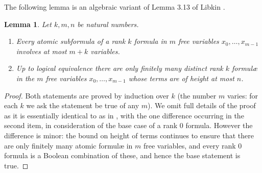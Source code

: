 \documentclass[10pt,a4paper]{amsart}
\theoremstyle{plain}
\newtheorem{lem}[thm]{Lemma}
\theoremstyle{definition}
\begin{document}
The following lemma is an algebraic variant of Lemma 3.13 of Libkin \cite{lib}.
\begin{lem}\label{lem:tpfinite}
Let $k,m,n$ be natural numbers.
\begin{enumerate}
\item Every atomic subformula of a rank $k$ formula in $m$ free variables $x_0,\dots,x_{m-1}$ involves at most $m+k$ variables.
\item Up to logical equivalence there are only finitely many distinct rank $k$ formul{\ae} in the $m$ free variables $x_0,\dots,x_{m-1}$ whose terms are of height at most $n$.
\end{enumerate}
\end{lem}
\begin{proof}
Both statements are proved by induction over $k$ (the number $m$ varies: for each $k$ we ask the statement be true of any $m$).  We omit full details of the proof as it is essentially identical to as in \cite[Lemma~3.13]{lib}, with the one difference occurring in the second item, in consideration of the base case of a rank $0$ formula.  However the difference is minor: the bound on height of terms continues to ensure that there are only finitely many atomic formul{\ae} in $m$ free variables, and every rank $0$ formula is a Boolean combination of these, and hence the base statement is true.   \end{proof}
\end{document}
